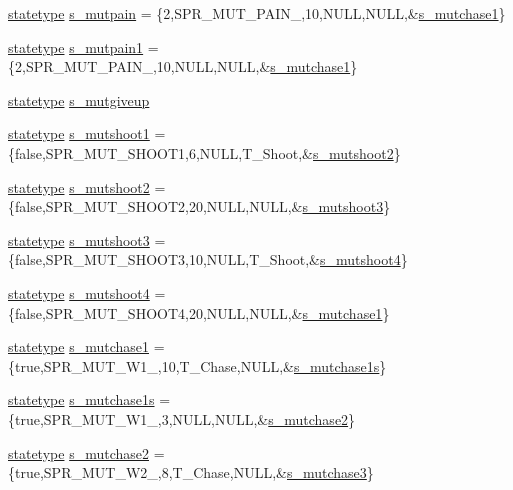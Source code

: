 \begin{DoxyCompactItemize}
\hyperlink{structstatestruct}{statetype} \hyperlink{WL__ACT2_8C_a9a4fddc816b63dd2533cb20ce08a0b6b}{s\_\-mutpain} = \{2,SPR\_\-MUT\_\-PAIN\_,10,NULL,NULL,\&\hyperlink{WL__DEF_8H_a5ee8dc5541dc82612a2a7e5ea048fa00}{s\_\-mutchase1}\}
\item 
\hyperlink{structstatestruct}{statetype} \hyperlink{WL__ACT2_8C_a9a4a31d3bf21ecf2c5a7f5c9b5c6f5d2}{s\_\-mutpain1} = \{2,SPR\_\-MUT\_\-PAIN\_,10,NULL,NULL,\&\hyperlink{WL__DEF_8H_a5ee8dc5541dc82612a2a7e5ea048fa00}{s\_\-mutchase1}\}
\item 
\hyperlink{structstatestruct}{statetype} \hyperlink{WL__ACT2_8C_aabb630177583a51ba96cd08b82e10694}{s\_\-mutgiveup}
\item 
\hyperlink{structstatestruct}{statetype} \hyperlink{WL__ACT2_8C_ad78a0d350573bc05593a1eac68975bef}{s\_\-mutshoot1} = \{false,SPR\_\-MUT\_\-SHOOT1,6,NULL,T\_\-Shoot,\&\hyperlink{WL__ACT2_8C_ac582ebfb069fba60e5cb6dc5657c6be6}{s\_\-mutshoot2}\}
\item 
\hyperlink{structstatestruct}{statetype} \hyperlink{WL__ACT2_8C_ac582ebfb069fba60e5cb6dc5657c6be6}{s\_\-mutshoot2} = \{false,SPR\_\-MUT\_\-SHOOT2,20,NULL,NULL,\&\hyperlink{WL__ACT2_8C_a9573d4752c5dcfc9aadd50674ed38f54}{s\_\-mutshoot3}\}
\item 
\hyperlink{structstatestruct}{statetype} \hyperlink{WL__ACT2_8C_a9573d4752c5dcfc9aadd50674ed38f54}{s\_\-mutshoot3} = \{false,SPR\_\-MUT\_\-SHOOT3,10,NULL,T\_\-Shoot,\&\hyperlink{WL__ACT2_8C_ab260f65f6ede523a2ccdab5d7426cb44}{s\_\-mutshoot4}\}
\item 
\hyperlink{structstatestruct}{statetype} \hyperlink{WL__ACT2_8C_ab260f65f6ede523a2ccdab5d7426cb44}{s\_\-mutshoot4} = \{false,SPR\_\-MUT\_\-SHOOT4,20,NULL,NULL,\&\hyperlink{WL__DEF_8H_a5ee8dc5541dc82612a2a7e5ea048fa00}{s\_\-mutchase1}\}
\item 
\hyperlink{structstatestruct}{statetype} \hyperlink{WL__ACT2_8C_a5ee8dc5541dc82612a2a7e5ea048fa00}{s\_\-mutchase1} = \{true,SPR\_\-MUT\_\-W1\_,10,T\_\-Chase,NULL,\&\hyperlink{WL__ACT2_8C_a9689e01ad9626ffb266e40ecf445fcd9}{s\_\-mutchase1s}\}
\item 
\hyperlink{structstatestruct}{statetype} \hyperlink{WL__ACT2_8C_a9689e01ad9626ffb266e40ecf445fcd9}{s\_\-mutchase1s} = \{true,SPR\_\-MUT\_\-W1\_,3,NULL,NULL,\&\hyperlink{WL__ACT2_8C_a001bae6f55f368c65e5babfd3469357b}{s\_\-mutchase2}\}
\item 
\hyperlink{structstatestruct}{statetype} \hyperlink{WL__ACT2_8C_a001bae6f55f368c65e5babfd3469357b}{s\_\-mutchase2} = \{true,SPR\_\-MUT\_\-W2\_,8,T\_\-Chase,NULL,\&\hyperlink{WL__ACT2_8C_a06932e0533b7423e4adc7d2adf58e406}{s\_\-mutchase3}\}

\end{DoxyCompactItemize}
